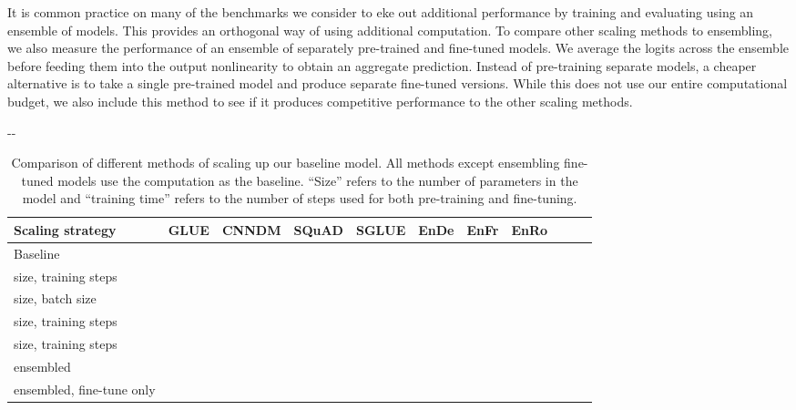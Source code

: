 \documentclass[twoside,11pt]{article}
\newlength{\offsetpage}
\newenvironment{widepage}{\begin{adjustwidth}{-\offsetpage}{-\offsetpage}\addtolength{\textwidth}{2\offsetpage}}{\end{adjustwidth}}
\newcommand{\bsl}{\makebox[0pt][r]{\raisebox{0.05em}{}}}
\begin{document}
It is common practice on many of the benchmarks we consider to eke out additional performance by training and evaluating using an ensemble of models.
This provides an orthogonal way of using additional computation.
To compare other scaling methods to ensembling, we also measure the performance of an ensemble of  separately pre-trained and fine-tuned models.
We average the logits across the ensemble before feeding them into the output  nonlinearity to obtain an aggregate prediction.
Instead of pre-training  separate models, a cheaper alternative is to take a single pre-trained model and produce  separate fine-tuned versions.
While this does not use our entire  computational budget, we also include this method to see if it produces competitive performance to the other scaling methods.


\begin{table}
\footnotesize
\begin{widepage}
\centering
\begin{tabular}{l c c c c c c c c c c}
\toprule
    Scaling strategy                         & GLUE        & CNNDM       & SQuAD       & SGLUE       & EnDe        & EnFr        & EnRo    \\
\midrule
    \bsl Baseline                            &      &      &      &      &      &      &  \\
     size,  training steps &      &      &      &      &      &      &  \\
     size,  batch size     &      &      &      &      &      &      &  \\
     size,  training steps &  &      &  &      &      &  &  \\
     size,  training steps &  &      &  &  &      &      &  \\
     ensembled                      &      &  &      &      &  &      &   \\
     ensembled, fine-tune only      &      &      &      &      &      &      &   \\
\bottomrule
\end{tabular}
\end{widepage}
\caption{
Comparison of different methods of scaling up our baseline model.
All methods except ensembling fine-tuned models use  the computation as the baseline.
``Size'' refers to the number of parameters in the model and ``training time'' refers to the number of steps used for both pre-training and fine-tuning.
}
\label{tab:scaling}
\end{table}
\end{document}
